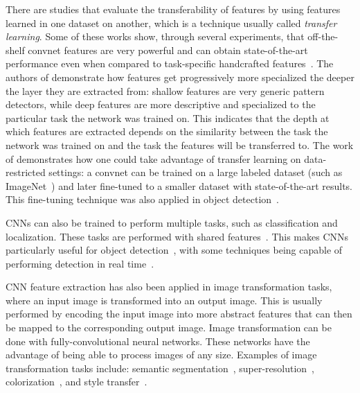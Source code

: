 There are studies that evaluate the transferability of features by using features learned in one dataset on another, which is a technique usually called \textit{transfer learning}. Some of these works show, through several experiments, that off-the-shelf convnet features are very powerful and can obtain state-of-the-art performance even when compared to task-specific handcrafted features~\cite{razavian2014cnn,donahue2014decaf}. The authors of \cite{yosinski2014how} demonstrate how features get progressively more specialized the deeper the layer they are extracted from: shallow features are very generic pattern detectors, while deep features are more descriptive and specialized to the particular task the network was trained on. This indicates that the depth at which features are extracted depends on the similarity between the task the network was trained on and the task the features will be transferred to. The work of \cite{oquab2014} demonstrates how one could take advantage of transfer learning on data-restricted settings: a convnet can be trained on a large labeled dataset (such as ImageNet~\cite{deng2009imagenet}) and later fine-tuned to a smaller dataset with state-of-the-art results. This fine-tuning technique was also applied in object detection~\cite{girshick2014rich}.

CNNs can also be trained to perform multiple tasks, such as classification and localization. These tasks are performed with shared features~\cite{sermanet2014overfeat,girshick2014rich}. This makes CNNs particularly useful for object detection~\cite{sermanet2014overfeat,girshick2014rich,girshick2015fast,he2015spatial,ren2015faster,dai2016rfcn,redmon2016yolo}, with some techniques being capable of performing detection in real time~\cite{redmon2016yolo}.

CNN feature extraction has also been applied in image transformation tasks, where an input image is transformed into an output image. This is usually performed by encoding the input image into more abstract features that can then be mapped to the corresponding output image. Image transformation can be done with fully-convolutional neural networks. These networks have the advantage of being able to process images of any size. Examples of image transformation tasks include: semantic segmentation~\cite{long2015fully,jegou2016one}, super-resolution~\cite{dong2014learning,johnson2016perceptual}, colorization~\cite{zhang2016colorful,larsson2016learning,iizuka2016let}, and style transfer~\cite{ulyanov2016texture,johnson2016perceptual}.

